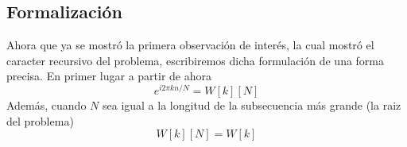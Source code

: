 \documentclass[assd_tp2_main.tex]{subfiles}
\begin{document}
\subsection{Formalización}
Ahora que ya se mostró la primera observación de interés, la cual mostró el caracter recursivo del problema, escribiremos dicha formulación de una forma precisa. En primer lugar a partir de ahora 
\begin{equation}
e^{i2\pi kn/N}=W[k][N]
\end{equation}
Además, cuando $N$ sea igual a la longitud de la subsecuencia más grande (la raiz del problema)
\begin{equation}
W[k][N]=W[k]
\end{equation} 
\end{document}
